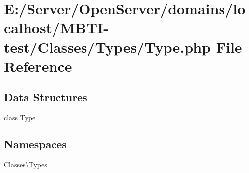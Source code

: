 \hypertarget{_type_8php}{}\section{E\+:/\+Server/\+Open\+Server/domains/localhost/\+M\+B\+T\+I-\/test/\+Classes/\+Types/\+Type.php File Reference}
\label{_type_8php}
\subsection*{Data Structures}
\begin{DoxyCompactItemize}
\item 
class \hyperlink{class_classes_1_1_types_1_1_type}{Type}
\end{DoxyCompactItemize}
\subsection*{Namespaces}
\begin{DoxyCompactItemize}
\item 
 \hyperlink{namespace_classes_1_1_types}{Classes\textbackslash{}\+Types}
\end{DoxyCompactItemize}
